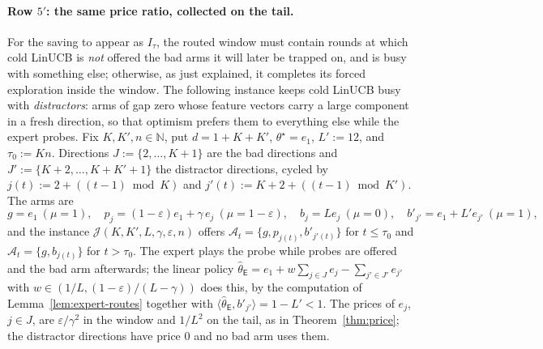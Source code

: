 \documentclass{article}
\theoremstyle{definition}
\theoremstyle{remark}
\newcommand{\N}{\mathbb{N}}
\newcommand{\eps}{\varepsilon}
\theoremstyle{remark}
\newcommand{\Exp}{\mathsf{E}}
\begin{document}
\paragraph{Row $5'$: the same price ratio, collected on the tail.}
For the saving to appear as $I_\tau$, the routed window must contain rounds
at which cold LinUCB is \emph{not} offered the bad arms it will later be
trapped on, and is busy with something else; otherwise, as just explained, it
completes its forced exploration inside the window. The following instance
keeps cold LinUCB busy with \emph{distractors}: arms of gap zero whose
feature vectors carry a large component in a fresh direction, so that
optimism prefers them to everything else while the expert probes. Fix
$K,K',n\in\N$, put $d=1+K+K'$, $\theta^\star=e_1$, $L':=12$, and
$\tau_0:=Kn$. Directions $J:=\{2,\dots,K+1\}$ are the bad directions and
$J':=\{K+2,\dots,K+K'+1\}$ the distractor directions, cycled by
$j(t):=2+((t-1)\bmod K)$ and $j'(t):=K+2+((t-1)\bmod K')$. The arms are
\[
g=e_1\ (\mu=1),\quad p_j=(1-\eps)e_1+\gamma\,e_j\ (\mu=1-\eps),\quad
b_j=Le_j\ (\mu=0),\quad b'_{j'}=e_1+L'e_{j'}\ (\mu=1),
\]
and the instance $\mathcal J(K,K',L,\gamma,\eps,n)$ offers
$\mathcal A_t=\{g,p_{j(t)},b'_{j'(t)}\}$ for $t\le\tau_0$ and
$\mathcal A_t=\{g,b_{j(t)}\}$ for $t>\tau_0$. The expert plays the probe while
probes are offered and the bad arm afterwards; the linear policy
$\widehat\theta_{\Exp}=e_1+w\sum_{j\in J}e_j-\sum_{j'\in J'}e_{j'}$ with
$w\in(1/L,(1-\eps)/(L-\gamma))$ does this, by the computation of
Lemma~\ref{lem:expert-routes} together with $\langle\widehat\theta_{\Exp},b'_{j'}\rangle=1-L'<1$.
The prices of $e_j$, $j\in J$, are $\eps/\gamma^2$ in the window and $1/L^2$ on
the tail, as in Theorem~\ref{thm:price}; the distractor directions have
price $0$ and no bad arm uses them.
\end{document}
